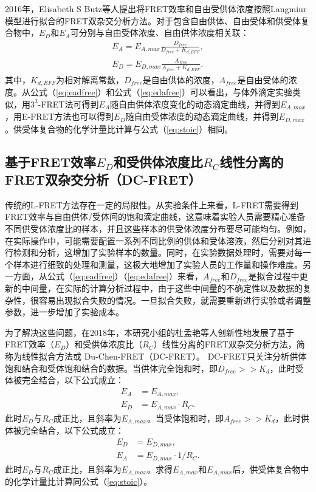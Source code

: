 2016年，Elisabeth S Butz等人提出将FRET效率和自由受供体浓度按照Langmiur模型进行拟合的FRET双杂交分析方法。对于包含自由供体、自由受体和供受体复合物中，$E_D$和$E_A$可分别与自由受体浓度、自由供体浓度相关联：
\begin{align}
    E_A = E_{A,max} \frac{D_{free}}{D_{free}+K_{d,EFF}}, \label{eq:eadfree} \\
    E_D = E_{D,max} \frac{A_{free}}{A_{free}+K_{d,EFF}}. \label{eq:edafree}
\end{align}
其中，$K_{d,EFF}$为相对解离常数，$D_{free}$是自由供体的浓度，$A_{free}$是自由受体的浓度。从公式（\ref{eq:eadfree}）和公式（\ref{eq:edafree}）可以看出，与体外滴定实验类似，用$3^3$-FRET法可得到$E_A$随自由供体浓度变化的动态滴定曲线，并得到$E_{A,max}$，用E-FRET方法也可以得到$E_D$随自由受体浓度的动态滴定曲线，并得到$E_{D,max}$。供受体复合物的化学计量比计算与公式（\ref{eq:stoic}）相同。
\fi

\subsection{\texorpdfstring{基于FRET效率$E_D$和受供体浓度比$R_C$线性分离的FRET双杂交分析（DC-FRET）}{基于FRET效率Ed和受供体浓度比Rc线性分离的FRET双杂交分析（DC-FRET）}}

\ifshowtext
传统的L-FRET方法存在一定的局限性。从实验条件上来看，L-FRET需要得到FRET效率与自由供体/受体间的饱和滴定曲线，这意味着实验人员需要精心准备不同供受体浓度比的样本，并且这些样本的供受体浓度分布要尽可能均匀。例如，在实际操作中，可能需要配置一系列不同比例的供体和受体溶液，然后分别对其进行检测和分析，这增加了实验样本的数量。同时，在实验数据处理时，需要对每一个样本进行细致的处理和测量，这极大地增加了实验人员的工作量和操作难度。另一方面，从公式（\ref{eq:eadfree}）（\ref{eq:edafree}）来看，$A_{free}$和$D_{free}$是拟合过程中更新的中间量，在实际的计算分析过程中，由于这些中间量的不确定性以及数据的复杂性，很容易出现拟合失败的情况。一旦拟合失败，就需要重新进行实验或者调整参数，进一步增加了实验成本。

为了解决这些问题，在2018年，本研究小组的杜孟艳等人创新性地发展了基于FRET效率（$E_D$）和受供体浓度比（$R_C$）线性分离的FRET双杂交分析方法，简称为线性拟合方法或 Du-Chen-FRET（DC-FRET）。
DC-FRET只关注分析供体饱和结合和受体饱和结合的数据。当供体完全饱和时，即$D_{free}>>K_d$，此时受体被完全结合，以下公式成立：
\begin{align} 
    E_A &= E_{A,max}, \label{eq:ea_appro} \\
    E_D &= {E_{A,max}}{\cdot}{R_C}. \label{eq:ea_slope}
\end{align}
此时$E_D$与$R_C$成正比，且斜率为$E_{A,max}$。当受体饱和时，即$A_{free}>>K_d$，此时供体被完全结合，以下公式成立：
\begin{align}
    E_D &= E_{D,max}, \label{eq:ed_appro} \\
    E_A &= E_{D,max}{\cdot}{1/R_C}. \label{eq:ed_slope}
\end{align}
此时$E_D$与$R_C$成正比，且斜率为$E_{A,max}$。求得$E_{A,max}$和$E_{A,max}$后，供受体复合物中的化学计量比计算同公式（\ref{eq:stoic}）。

